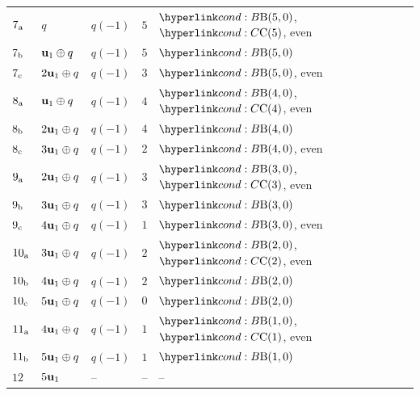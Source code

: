 \begin{center}
\begin{table}
\begin{tabular}{lllll}
    \midrule 
    
    \(7_{\rm a}\) & \(q\) & \(q(-1)\) & \(5\) & \(\condB{5,0}\), \(\condC{5}\), even \\
    \(7_{\rm b}\) & \(\mathbf{u}_1 \oplus q\) & \(q(-1)\) & \(5\) & \(\condB{5,0}\) \\
    \(7_{\rm c}\) & \(2\mathbf{u}_1 \oplus q\) & \(q(-1)\) & \(3\) & \(\condB{5,0}\), even \\
    
    \midrule 
    
    \(8_{\rm a}\) & \(\mathbf{u}_1 \oplus q\) & \(q(-1)\) & \(4\) & \(\condB{4,0}\), \(\condC{4}\), even \\
    \(8_{\rm b}\) & \(2\mathbf{u}_1 \oplus q\) & \(q(-1)\) & \(4\) & \(\condB{4,0}\) \\
    \(8_{\rm c}\) & \(3\mathbf{u}_1 \oplus q\) & \(q(-1)\) & \(2\) & \(\condB{4,0}\), even \\
    
    \midrule

    \(9_{\rm a}\) & \(2\mathbf{u}_1 \oplus q\) & \(q(-1)\) & \(3\) & \(\condB{3,0}\), \(\condC{3}\), even \\
    \(9_{\rm b}\) & \(3\mathbf{u}_1 \oplus q\) & \(q(-1)\) & \(3\) & \(\condB{3,0}\) \\
    \(9_{\rm c}\) & \(4\mathbf{u}_1 \oplus q\) & \(q(-1)\) & \(1\) & \(\condB{3,0}\), even \\
    
    \midrule
    
    \(10_{\rm a}\) & \(3\mathbf{u}_1 \oplus q\) & \(q(-1)\) & \(2\) & \(\condB{2,0}\), \(\condC{2}\), even \\
    \(10_{\rm b}\) & \(4\mathbf{u}_1 \oplus q\) & \(q(-1)\) & \(2\) & \(\condB{2,0}\) \\
    \(10_{\rm c}\) & \(5\mathbf{u}_1 \oplus q\) & \(q(-1)\) & \(0\) & \(\condB{2,0}\) \\ 
    
    \midrule

    \(11_{\rm a}\) & \(4\mathbf{u}_1 \oplus q\) & \(q(-1)\) & \(1\) & \(\condB{1,0}\), \(\condC{1}\), even \\
    \(11_{\rm b}\) & \(5\mathbf{u}_1 \oplus q\) & \(q(-1)\) & \(1\) & \(\condB{1,0}\) \\  
    
    \midrule 
    
    \(12\) & \(5\mathbf{u}_1\) & -- & -- & -- \\
    

    \bottomrule
    \end{tabular}
\end{table}
\end{center}
